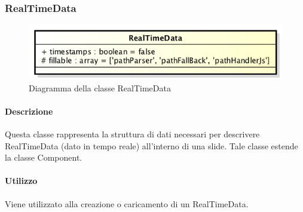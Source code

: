 \subsubsection{RealTimeData}

	\begin{figure}[h]
		\centering
		\includegraphics[width=0.5\linewidth]{img/back_end_premi_model_realTimeData}
		\caption[Diagramma della classe RealTimeData]{Diagramma della classe RealTimeData}
		\label{fig:back_end_premi_model_realTimeData}
	\end{figure}


	\paragraph{Descrizione}
	Questa classe rappresenta la struttura di dati necessari per descrivere RealTimeData (dato in tempo reale) all'interno di una slide. Tale classe estende la classe Component.
	
	\paragraph{Utilizzo}
	Viene utilizzato alla creazione o caricamento di un RealTimeData.
	
